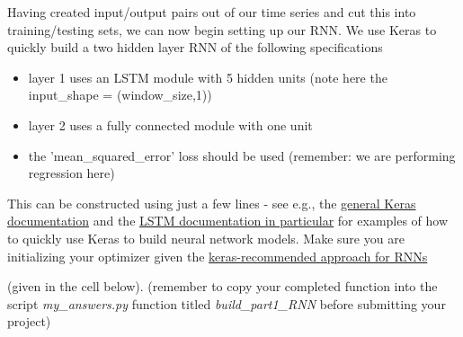 \documentclass[11pt]{article}
\providecommand{\tightlist}{%
      \setlength{\itemsep}{0pt}\setlength{\parskip}{0pt}}
\begin{document}
Having created input/output pairs out of our time series and cut this
into training/testing sets, we can now begin setting up our RNN. We use
Keras to quickly build a two hidden layer RNN of the following
specifications

\begin{itemize}
\tightlist
\item
  layer 1 uses an LSTM module with 5 hidden units (note here the
  input\_shape = (window\_size,1))
\item
  layer 2 uses a fully connected module with one unit
\item
  the 'mean\_squared\_error' loss should be used (remember: we are
  performing regression here)
\end{itemize}

This can be constructed using just a few lines - see e.g., the
\href{https://keras.io/getting-started/sequential-model-guide/}{general
Keras documentation} and the
\href{https://keras.io/layers/recurrent/}{LSTM documentation in
particular} for examples of how to quickly use Keras to build neural
network models. Make sure you are initializing your optimizer given the
\href{https://keras.io/optimizers/}{keras-recommended approach for RNNs}

(given in the cell below). (remember to copy your completed function
into the script \emph{my\_answers.py} function titled
\emph{build\_part1\_RNN} before submitting your project)
\end{document}
